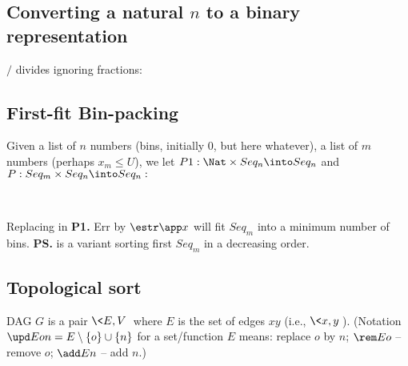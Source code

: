 \documentclass[leqno]{article}
\begin{document}
\subsection{Converting a natural $n$ to a binary representation} 
$/$ divides ignoring fractions:
\begin{ites}
\end{ites}

\subsection{First-fit Bin-packing}
Given a list of $n$ numbers (bins, initially 0, but here whatever), a list of 
$m$ numbers 
(perhaps $x_m\leq U$), we let
$P1:\Nat\times Seq_n\into Seq_n$ and $P:Seq_m\times Seq_n\into Seq_n:$\vspace*{1ex}

\noindent
\begin{iten}
\end{iten}
\hspace*{.5em}
\begin{iten}
 \\[1ex]
\end{iten}
Replacing in {\bf P1.} Err by $\estr\app x$ will fit
$Seq_m$ into a minimum number of bins. {\bf PS.} is a variant sorting first 
$Seq_m$ in a decreasing order.

\newpage\subsection{Topological sort}
DAG $G$ is a pair $\<E,V\>$ where $E$ is the set of edges $xy$ (i.e., $\<x,y\>$).
(Notation $\upd Eon=E\setminus\{o\}\cup\{n\}$ for a set/function $E$ means: 
replace $o$ by $n$; $\rem Eo$ -- remove $o$; $\add En$ -- add $n$.)
\end{document}

